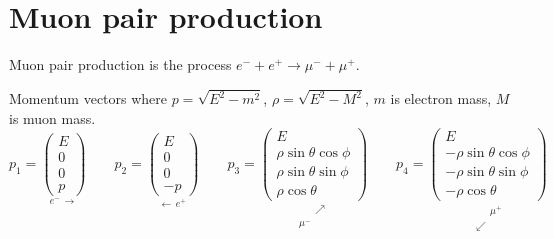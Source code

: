 

\section*{Muon pair production}

Muon pair production is the process $e^-+e^+\rightarrow\mu^-+\mu^+$.

\begin{center}
\end{center}

Momentum vectors where $p=\sqrt{E^2-m^2}$, $\rho=\sqrt{E^2-M^2}$, $m$ is electron mass, $M$ is muon mass.
\begin{equation*}
p_1=\underset{e^- \, \longrightarrow}
{\begin{pmatrix}E\\0\\0\\p\end{pmatrix}}
\qquad
p_2=\underset{\longleftarrow \, e^+}
{\begin{pmatrix}E\\0\\0\\-p\end{pmatrix}}
\qquad
p_3=\underset{\substack{\phantom{\mu^-} \, \nearrow\\\mu^- \, \phantom{\nearrow}}}
{\begin{pmatrix}
E\\
\rho\sin\theta\cos\phi\\
\rho\sin\theta\sin\phi\\
\rho\cos\theta
\end{pmatrix}}
\qquad
p_4=
\underset{\substack{\phantom{\swarrow} \, \mu^+\\\swarrow \, \phantom{\mu^+}}}
{\begin{pmatrix}
E\\
-\rho\sin\theta\cos\phi\\
-\rho\sin\theta\sin\phi\\
-\rho\cos\theta
\end{pmatrix}}
\end{equation*}

